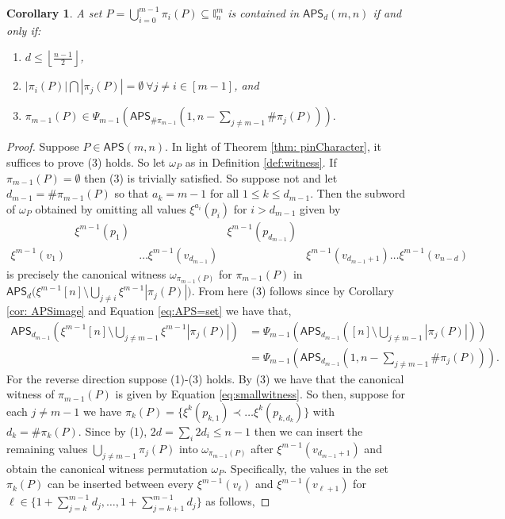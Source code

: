 \documentclass[12pt,reqno]{amsart}
\numberwithin{equation}{section}
\theoremstyle{plain}
\newtheorem{corollary}[theorem]{Corollary}
\theoremstyle{definition}
\theoremstyle{remark}
\newcommand{\I}{\mathbb{I}}
\newcommand\APS{\mathsf{APS}}
\newcommand{\floor}[1]{\left\lfloor#1\right\rfloor}
\begin{document}
\begin{corollary}\label{cor:pinCharacter}
    A set $P=\bigcup_{i=0}^{m-1}\pi_i(P) \subseteq \I_n^m$ is contained in $\APS_d(m,n)$ 
    if and only if:
    \begin{enumerate}
        \item $d\leq \floor{\frac{n-1}{2}}$,
        \item $|\pi_i(P)| \bigcap |\pi_j(P)| =  \emptyset  \ \forall j \neq i \in [m-1]$, and
        \item $\pi_{m-1}(P) \in \Psi_{m-1}\left(\APS_{\#\pi_{m-1}}\left(1, n- \sum_{j\neq m-1}\# \pi_j(P)\right)\right).$
    \end{enumerate}
\end{corollary}
\begin{proof}
Suppose $P \in \APS(m,n)$. In light of Theorem \ref{thm: pinCharacter}, it suffices to prove (3) holds.   
So let $\omega_P$ as in Definition \ref{def:witness}. If $\pi_{m-1}(P)=\emptyset$ then (3) is trivially satisfied. So suppose not and let $d_{m-1}=\#\pi_{m-1}(P)$ so that $a_k=m-1$ for all $1\leq k\leq d_{m-1}$. Then the subword of $\omega_P$ obtained by omitting all values $\xi^{a_i}(p_i)$ for $i>d_{m-1}$ given by
\begin{equation*} 
\begin{matrix}&\xi^{m-1}(p_1)&&\xi^{m-1}(p_{d_{m-1}})\\
\xi^{m-1}(v_1)&& \dots \xi^{m-1}(v_{d_{m-1}})&& \xi^{m-1}(v_{d_{m-1}+1})\dots \xi^{m-1}(v_{n-d})
\end{matrix} 
\end{equation*}
is precisely the canonical witness $\omega_{\pi_{m-1}(P)}$ for $\pi_{m-1}(P)$ in  $\APS_d\Big(\xi^{m-1}[n] \setminus \bigcup_{j\neq i}\xi^{m-1}|\pi_j(P)|\Big)$. From here (3) follows since by Corollary \ref{cor: APSimage} and Equation \eqref{eq:APS=set} we have that,
\begin{align*}
\APS_{d_{m-1}}\left(\xi^{m-1}[n] \setminus \bigcup_{j\neq m-1}\xi^{m-1}|\pi_j(P)|\right) &= \Psi_{m-1}\left(\APS_{d_{m-1}}\left([n] \setminus \bigcup_{j\neq m-1}|\pi_j(P)|\right)\right)\\
&=\Psi_{m-1}\left(\APS_{d_{m-1}}\left(1, n- \sum_{j\neq m-1}\# \pi_j(P)\right)\right).
\end{align*}
For the reverse direction suppose (1)-(3) holds. By (3) we have that the canonical witness of $\pi_{m-1}(P)$ is given by Equation \eqref{eq:smallwitness}. So then, suppose for each $j \neq m-1$ we have $\pi_k(P) = \{\xi^k(p_{k,1})\prec \dots \xi^k(p_{k,d_k})\}$ with $d_k = \# \pi_k(P)$. Since by (1), $2d = \sum_i 2d_i \leq n-1$ then we can insert the remaining values $\bigcup_{j\neq m-1} \pi_j(P)$ into $\omega_{\pi_{m-1}(P)}$ after $\xi^{m-1}(v_{d_{m-1}+1})$ and obtain the canonical witness permutation $\omega_{P}$. Specifically, the values in the set $\pi_k(P)$ can be inserted between every $\xi^{m-1}(v_\ell)$ and $\xi^{m-1}(v_{\ell+1})$ for $\ell \in \{ 1+\sum_{j=k}^{m-1} d_j, \dots, 1+\sum_{j=k+1}^{m-1} d_j\}$ as follows,

\end{proof}
\end{document}
